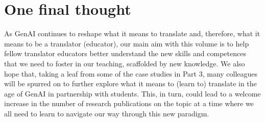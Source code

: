 \documentclass[output=paper]{langscibook}
\begin{document}
\section{One final thought}
As GenAI continues to reshape what it means to translate and, therefore, what it means to be a translator (educator), our main aim with this volume is to help fellow translator educators better understand the new skills and competences that we need to foster in our teaching, scaffolded by new knowledge. We also hope that, taking a leaf from some of the case studies in Part 3, many colleagues will be spurred on to further explore what it means to (learn to) translate in the age of GenAI in partnership with students. This, in turn, could lead to a welcome increase in the number of research publications on the topic at a time where we all need to learn to navigate our way through this new paradigm.


{\sloppy\printbibliography[heading=subbibliography]}
\end{document}
